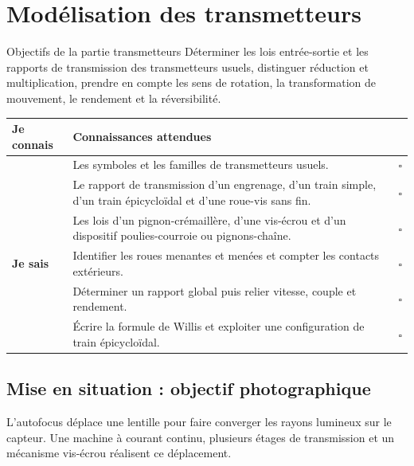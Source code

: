 
\section{Modélisation des transmetteurs}
\label{sec:trans-objectifs}

\begin{TLThreeMethod}{Objectifs de la partie transmetteurs}
Déterminer les lois entrée-sortie et les rapports de transmission des
transmetteurs usuels, distinguer réduction et multiplication, prendre en
compte les sens de rotation, la transformation de mouvement, le
rendement et la réversibilité.
\end{TLThreeMethod}

\begin{center}
\small
\begin{tabularx}{\linewidth}{>{\bfseries}p{2cm}X c}
\toprule
Je connais & Connaissances attendues & \\
\midrule
& Les symboles et les familles de transmetteurs usuels. & $\square$\\
& Le rapport de transmission d'un engrenage, d'un train simple, d'un train épicycloïdal et d'une roue-vis sans fin. & $\square$\\
& Les lois d'un pignon-crémaillère, d'une vis-écrou et d'un dispositif poulies-courroie ou pignons-chaîne. & $\square$\\
\midrule
Je sais & Identifier les roues menantes et menées et compter les contacts extérieurs. & $\square$\\
& Déterminer un rapport global puis relier vitesse, couple et rendement. & $\square$\\
& Écrire la formule de Willis et exploiter une configuration de train épicycloïdal. & $\square$\\
\bottomrule
\end{tabularx}
\end{center}

\subsection{Mise en situation : objectif photographique}

L'autofocus déplace une lentille pour faire converger les rayons lumineux
sur le capteur. Une machine à courant continu, plusieurs étages de
transmission et un mécanisme vis-écrou réalisent ce déplacement.


